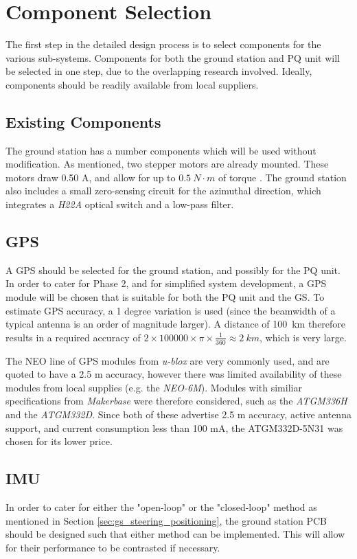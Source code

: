 \graphicspath{{./figures}}

\section{Component Selection}
The first step in the detailed design process is to select components for the various sub-systems. Components for both the ground station and PQ unit will be selected in one step, due to the overlapping research involved. Ideally, components should be readily available from local suppliers.

\subsection{Existing Components}
The ground station has a number components which will be used without modification. As mentioned, two stepper motors are already mounted. These motors draw 0.50 A, and allow for up to $\SI{0.5}{N \cdot m}$ of torque \cite{datasheet-4118}. The ground station also includes a small zero-sensing circuit for the azimuthal direction, which integrates a \textit{H22A} optical switch \cite{datasheet-H22A1} and a low-pass filter.

\subsection{GPS}\label{sec:components_gps}
A GPS should be selected for the ground station, and possibly for the PQ unit. In order to cater for Phase 2, and for simplified system development, a GPS module will be chosen that is suitable for both the PQ unit and the GS. To estimate GPS accuracy, a 1 degree variation is used (since the beamwidth of a typical antenna is an order of magnitude larger). A distance of \SI{100}{km} therefore results in a required accuracy of $2 \times 100 000 \times \pi \times \frac{1}{360} \approx \SI{2}{km}$, which is very large.

The NEO line of GPS modules from \textit{u-blox} are very commonly used, and are quoted to have a 2.5 m accuracy, however there was limited availability of these modules from local supplies (e.g. the \textit{NEO-6M}). Modules with similiar specifications from \textit{Makerbase} were therefore considered, such as the \textit{ATGM336H} and the \textit{ATGM332D}. Since both of these advertise 2.5 m accuracy, active antenna support, and current consumption less than 100 mA, the ATGM332D-5N31 was chosen for its lower price.

\subsection{IMU}
In order to cater for either the "open-loop" or the "closed-loop" method as mentioned in Section \ref{sec:gs_steering_positioning}, the ground station PCB should be designed such that either method can be implemented. This will allow for their performance to be contrasted if necessary.

